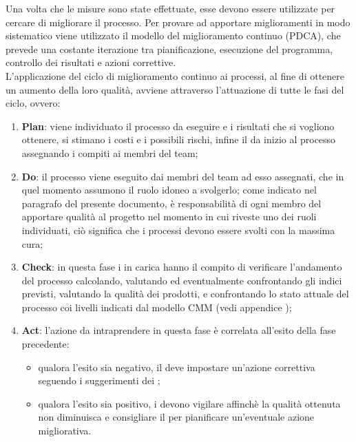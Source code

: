 		Una volta che le misure sono state effettuate, esse devono essere utilizzate per cercare di migliorare il processo. Per provare ad apportare miglioramenti in modo sistematico viene utilizzato il modello del miglioramento continuo (PDCA), che prevede una costante iterazione tra pianificazione, esecuzione del programma, controllo dei risultati e azioni correttive.\\
		L'applicazione del ciclo di miglioramento continuo ai processi, al fine di ottenere un aumento della loro qualità, avviene attraverso l'attuazione di tutte le fasi del ciclo, ovvero:
		\begin{enumerate}
		\item \textbf{Plan}: viene individuato il processo da eseguire e i risultati che si vogliono ottenere, si stimano i costi e i possibili rischi, infine il  da inizio al processo assegnando i compiti ai membri del team;
		\item \textbf{Do}: il processo viene eseguito dai membri del team ad esso assegnati, che in quel momento assumono il ruolo idoneo a svolgerlo; come indicato nel paragrafo  del presente documento, è responsabilità di ogni membro del \groupname{} apportare qualità al progetto nel momento in cui riveste uno dei ruoli individuati, ciò significa che i processi devono essere svolti con la massima cura;
		\item \textbf{Check}: in questa fase i  in carica hanno il compito di verificare l'andamento del processo calcolando, valutando ed eventualmente confrontando gli indici previsti, valutando la qualità dei prodotti, e confrontando lo stato attuale del processo coi livelli indicati dal modello CMM (vedi appendice );
		\item \textbf{Act}: l'azione da intraprendere in questa fase è correlata all'esito della fase precedente:
		\begin{itemize}
		\item qualora l'esito sia negativo, il  deve impostare un'azione correttiva seguendo i suggerimenti dei ;
		\item qualora l'esito sia positivo, i  devono vigilare affinchè la qualità ottenuta non diminuisca e consigliare il  per pianificare un'eventuale azione migliorativa.
		\end{itemize}
		\end{enumerate}
